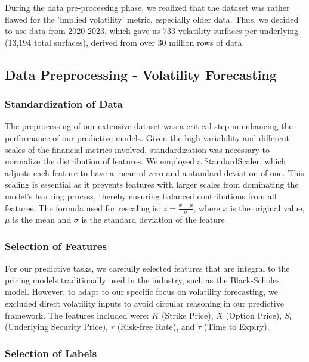 \documentclass[10pt]{article}
\begin{document}
During the data pre-processing phase, we realized that the dataset was rather flawed for the 'implied volatility' metric, especially older data. Thus, we decided to use data from 2020-2023, which gave us 733 volatility surfaces per underlying (13,194 total surfaces), derived from over 30 million rows of data.

\subsection{Data Preprocessing - Volatility Forecasting}

\subsubsection{Standardization of Data}
The preprocessing of our extensive dataset was a critical step in enhancing the performance of our predictive models. Given the high variability and different scales of the financial metrics involved, standardization was necessary to normalize the distribution of features\cite{singh2020investigating}. We employed a StandardScaler, which adjusts each feature to have a mean of zero and a standard deviation of one. This scaling is essential as it prevents features with larger scales from dominating the model’s learning process, thereby ensuring balanced contributions from all features. The formula used for rescaling is: \hspace{0cm}\(z = \frac{x - \mu}{\sigma}\), where \(x\) is the original value, \(\mu\) is the mean and \(\sigma\) is the standard deviation of the feature

\subsubsection{Selection of Features}
For our predictive tasks, we carefully selected features that are integral to the pricing models traditionally used in the industry, such as the Black-Scholes model. However, to adapt to our specific focus on volatility forecasting, we excluded direct volatility inputs to avoid circular reasoning in our predictive framework. The features included were:  \(K\) (Strike Price), \(X\) (Option Price), \(S_t\) (Underlying Security Price), \(r\) (Risk-free Rate), and \(\tau\) (Time to Expiry).

\subsubsection{Selection of Labels}
\end{document}

